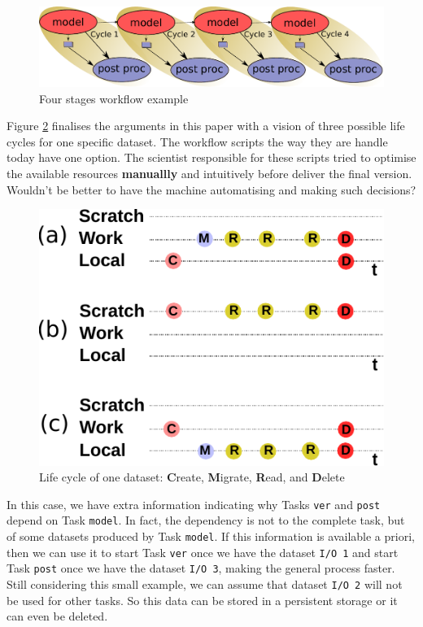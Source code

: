 \documentclass[a4paper]{article}
\begin{document}
\begin{figure}[H]
  \centering
  \includegraphics[width=0.6\columnwidth]{cycle-4}
  \caption{Four stages workflow example}
  \label{fig:cycle-4}
\end{figure}

Figure \ref{fig:lifecycle} finalises the arguments in this paper with a vision of three possible life cycles for one specific dataset. The workflow scripts the way they are handle today have one option. The scientist responsible for these scripts tried to optimise the available resources \textbf{manuallly} and intuitively before deliver the final version. Wouldn't be better to have the machine automatising and making such decisions?

\begin{figure}[H]
  \centering
  \includegraphics[width=0.6\columnwidth]{lifecycle}
  \caption{Life cycle of one dataset: \textbf{C}reate, \textbf{M}igrate, \textbf{R}ead, and \textbf{D}elete}
  \label{fig:lifecycle}
\end{figure}

In this case, we have extra information indicating why Tasks \texttt{ver} and \texttt{post} depend on Task \texttt{model}. In fact, the dependency is not to the complete task, but of some datasets produced by Task \texttt{model}. If this information is available a priori, then we can use it to start Task \texttt{ver} once we have the dataset \texttt{I/O 1} and start Task \texttt{post} once we have the dataset \texttt{I/O 3}, making the general process faster. Still considering this small example, we can assume that dataset \texttt{I/O 2} will not be used for other tasks. So this data can be stored in a persistent storage or it can even be deleted.
\end{document}
